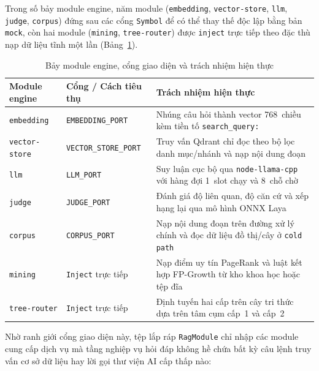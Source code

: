 Trong số bảy module engine, năm module (\texttt{embedding}, \texttt{vector-store}, \texttt{llm}, \texttt{judge}, \texttt{corpus}) đứng sau các cổng \texttt{Symbol} để có thể thay thế độc lập bằng bản \texttt{mock}, còn hai module (\texttt{mining}, \texttt{tree-router}) được \texttt{inject} trực tiếp theo đặc thù nạp dữ liệu tĩnh một lần (Bảng~\ref{tab:bay-module-engine}).

\begin{table}[htbp]
\centering
\caption{Bảy module engine, cổng giao diện và trách nhiệm hiện thực}
\label{tab:bay-module-engine}
\small
\begin{tabularx}{\textwidth}{
  >{\raggedright\arraybackslash}p{2.7cm}
  >{\raggedright\arraybackslash}p{4.1cm}
  >{\raggedright\arraybackslash}X
}
\toprule
\textbf{Module engine} & \textbf{Cổng / Cách tiêu thụ} & \textbf{Trách nhiệm hiện thực} \\
\midrule
\texttt{embedding} & \texttt{EMBEDDING\_\allowbreak{}PORT} & Nhúng câu hỏi thành vector 768~chiều kèm tiền tố \texttt{search\_query: } \\
\midrule
\texttt{vector-store} & \texttt{VECTOR\_\allowbreak{}STORE\_\allowbreak{}PORT} & Truy vấn Qdrant chỉ đọc theo bộ lọc danh mục/nhánh và nạp nội dung đoạn \\
\midrule
\texttt{llm} & \texttt{LLM\_\allowbreak{}PORT} & Suy luận cục bộ qua \texttt{node-\allowbreak{}llama-\allowbreak{}cpp} với hàng đợi 1~slot chạy và 8~chỗ chờ \\
\midrule
\texttt{judge} & \texttt{JUDGE\_\allowbreak{}PORT} & Đánh giá độ liên quan, độ căn cứ và xếp hạng lại qua mô hình ONNX Laya \\
\midrule
\texttt{corpus} & \texttt{CORPUS\_\allowbreak{}PORT} & Nạp nội dung đoạn trên đường xử lý chính và đọc dữ liệu đồ thị/cây ở \texttt{cold path} \\
\midrule
\texttt{mining} & \texttt{Inject} trực tiếp & Nạp điểm uy tín PageRank và luật kết hợp FP-Growth từ kho khoa học hoặc tệp đĩa \\
\midrule
\texttt{tree-router} & \texttt{Inject} trực tiếp & Định tuyến hai cấp trên cây tri thức dựa trên tâm cụm cấp~1 và cấp~2 \\
\bottomrule
\end{tabularx}
\end{table}

Nhờ ranh giới cổng giao diện này, tệp lắp ráp \texttt{RagModule} chỉ nhập các module cung cấp dịch vụ mà tầng nghiệp vụ hỏi đáp không hề chứa bất kỳ câu lệnh truy vấn cơ sở dữ liệu hay lời gọi thư viện AI cấp thấp nào:

